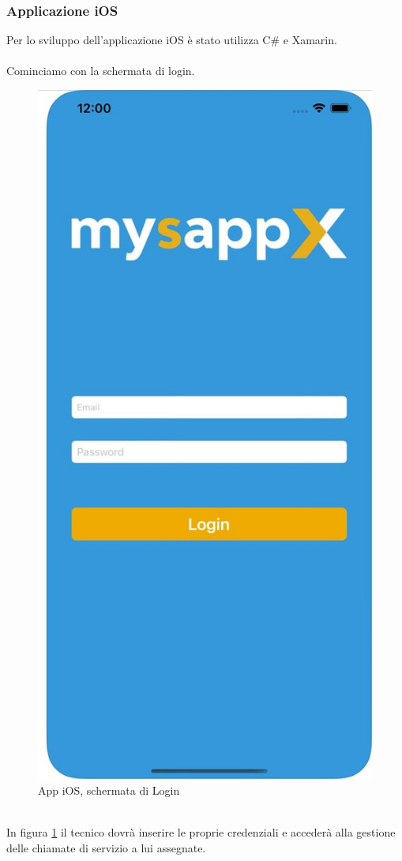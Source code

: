 \subsubsection{Applicazione iOS}
Per lo sviluppo dell'applicazione iOS è stato utilizza C\# e Xamarin.\\\\
Cominciamo con la schermata di login.\\
\begin{figure}[!h] 
	\centering 
	\includegraphics[scale = 0.2]{immagini/app iOS/login-iOS.jpeg} 
	\caption {App iOS, schermata di Login}
	\label{fig:2-14}
\end{figure}
\\In figura \ref{fig:2-14} il tecnico dovrà inserire le proprie credenziali e accederà alla gestione delle chiamate di servizio a lui assegnate.
\newpage

